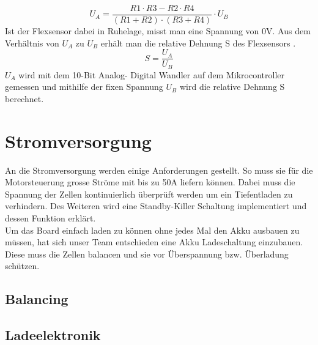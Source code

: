 \begin{equation}\label{glg_U_A}
 U_A=\frac{R1 \cdot R3-R2 \cdot R4}{(R1+R2) \cdot (R3+R4)} \cdot U_B 
\end{equation}
Ist der Flexsensor dabei in Ruhelage, misst man eine Spannung von 0V. Aus dem Verhältnis von $ U_A $ zu $ U_B $ erhält man die relative Dehnung S des Flexsensors .
\begin{equation}\label{S_relativeDehnung}
S=\frac{U_A}{U_B}
\end{equation}
$U_A$ wird mit dem 10-Bit Analog- Digital Wandler auf dem Mikrocontroller gemessen und mithilfe der fixen Spannung $U_B$ wird die relative Dehnung S berechnet. 


\section{Stromversorgung}
\label{HW_Stromversorgung}
An die Stromversorgung werden einige Anforderungen gestellt. So muss sie für die Motorsteuerung grosse Ströme mit bis zu 50A liefern können. Dabei muss die Spannung der Zellen kontinuierlich überprüft werden um ein Tiefentladen zu verhindern. Des Weiteren wird eine Standby-Killer Schaltung implementiert und dessen Funktion erklärt.\\
Um das Board einfach laden zu können ohne jedes Mal den Akku ausbauen zu müssen, hat sich unser Team entschieden eine Akku Ladeschaltung einzubauen. Diese muss die Zellen balancen und sie vor Überspannung bzw. Überladung schützen. 
\subsection*{Balancing}


\subsection*{Ladeelektronik}


